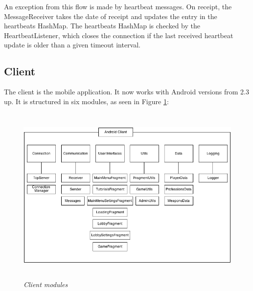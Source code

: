 \documentclass{article}
\begin{document}
An exception from this flow is made by heartbeat messages. On receipt, the
MessageReceiver takes the date of receipt and updates the entry in the
heartbeats HashMap. The heartbeats HashMap is checked by the HeartbeatListener,
which closes the connection if the last received heartbeat update is older than
a given timeout interval.\newline

\subsection{Client}

The client is the mobile application. It now works with Android versions from
2.3 up. It is structured in six modules, as seen in Figure \ref{fig:clientModules}:

\begin{figure}
\includegraphics[height=3.5in,width=6.23in]{./images/diagrams/client_modules.png}  
\caption{\small \sl Client modules \label{fig:clientModules}}
\end{figure}
\end{document}
